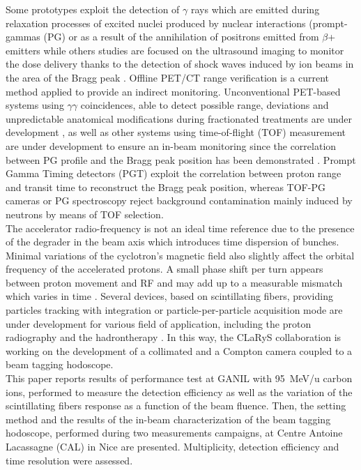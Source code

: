\documentclass[a4paper,11pt]{article}
\begin{document}
Some prototypes exploit the detection of $\gamma$ rays which are emitted during  relaxation  processes of excited nuclei produced by nuclear interactions (prompt-gammas (PG) or as a result of the annihilation of positrons emitted from $\beta$+ emitters while others studies are focused on the ultrasound imaging to monitor the dose delivery thanks to the detection of shock waves induced by ion beams in the area of the Bragg peak \cite{Hickling2018}. Offline PET/CT range verification is a current method applied to provide an indirect monitoring. Unconventional PET-based systems using $\gamma\gamma$ coincidences, able to detect possible range, deviations and unpredictable anatomical modifications during fractionated treatments are under development \cite{Crespo2005, Parodi2015}, as well as other systems using time-of-flight (TOF) measurement are under development to ensure an in-beam monitoring since the correlation between PG profile and the Bragg peak position has been demonstrated \cite{Testa2008}. Prompt Gamma Timing detectors (PGT) exploit the correlation between proton range and transit time to reconstruct the Bragg peak position\cite{Marcatili2020}, whereas TOF-PG cameras or PG spectroscopy reject background contamination mainly induced by neutrons  by means of TOF selection. \\

The accelerator radio-frequency is not an ideal time reference due to the presence of the degrader in the beam axis which introduces time dispersion of bunches. Minimal variations of the cyclotron’s magnetic field also slightly affect the orbital frequency of the accelerated protons. A small phase shift per turn appears between proton movement and RF and may add up to a measurable mismatch which varies in time \cite{Werner2019}. Several devices, based on scintillating fibers, providing particles tracking with integration \cite{Leverington2018} or particle-per-particle \cite{Horikawa2004, Achenbach2008, Braccini2012} acquisition mode are under development for various field of application, including the proton radiography \cite{Presti2013} and the hadrontherapy \cite{PAPA2016}. 
In this way, the CLaRyS collaboration is working on the development of a collimated and a Compton camera coupled to a beam tagging hodoscope.\\

This paper reports results of performance test at GANIL with 95~MeV/u carbon ions, performed to measure the detection efficiency as well as the variation of the scintillating fibers response as a function of the beam fluence. Then, the setting method and the results of the in-beam characterization of the beam tagging hodoscope, performed during two measurements campaigns, at Centre Antoine Lacassagne (CAL) in Nice are presented. Multiplicity, detection efficiency and time resolution were assessed.
\end{document}
